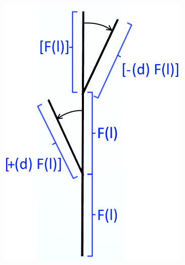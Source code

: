 \newpage
\begin{center}
	\begin{minipage}[c]{0.45\textwidth}
		\centering
		\includegraphics[height=.75\textheight]{images/CH2_Branching2_N1L15D25.png}
		

\end{minipage}
\end{center}
